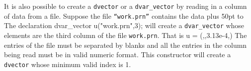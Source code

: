 \documentclass[12pt]{book}
\begin{document}
It is also possible to create a {\tt dvector} or a {\tt dvar\_vector}
by reading in a column of data from a file. Suppose the file
{\tt ``work.prn''} contains the data
\medbreak
\vbox{
\tabskip=0pt plus 50pt
 \halign to }
\medbreak
The declaration
\beginexamplea
dvar_vector u("work.prn",3);
\endexample
\noindent will create a {\tt dvar\_vector} whose elements are the
third column of the file {\tt work.prn}. That is
\beginexamplea
u = (,,\ts3.13e-4,\ts)
\endexample
\noindent The entries of the file
must be separated by blanks and all the entries in the column being
read must be in valid numeric format.
This constructor will create a {\tt dvector} whose minimum valid
index is 1.

% 
% 
\end{document}
